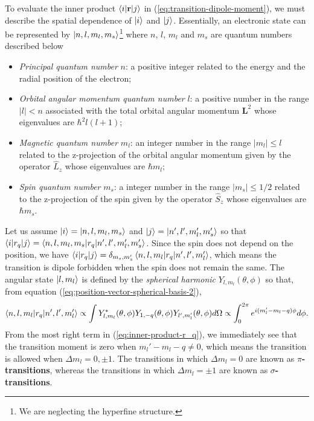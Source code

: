 To evaluate the inner product $ \braket{i|\mathbf{r}|j} $ in (\ref{eq:transition-dipole-moment}), we must describe the spatial dependence of $ \ket{i} $ and $ \ket{j} $. Essentially, an electronic state can be represented by $ \ket{n, l, m_l, m_s} $\footnote{We are neglecting the hyperfine structure.} where $n$, $l$, $m_l$ and $ m_s $ are quantum numbers described below
\begin{itemize}
	\item \textit{Principal quantum number} $ n $: a positive integer related to the energy and the radial position of the electron;

	\item \textit{Orbital angular momentum quantum number} $ l $: a positive number in the range $ |l| < n  $ associated with the total orbital angular momentum $ \mathbf{L}^2 $ whose eigenvalues are $ \hbar^2 l(l + 1) $;

	\item \textit{Magnetic quantum number} $ m_l $: an integer number in the range $ |m_l| \leq l $ related to the z-projection of the orbital angular momentum given by the operator $ \hat{L}_z $ whose eigenvalues are $ \hbar m_l $;

	\item \textit{Spin quantum number} $ m_s $: a integer number in the range $ |m_s| \leq 1/2 $ related to the z-projection of the spin given by the operator $ \hat{S}_z $ whose eigenvalues are $ \hbar m_s $.
\end{itemize}

Let us assume $ \ket{i} = \ket{n,l,m_l,m_s} $ and $ \ket{j} = \ket{n',l',m_l',m_s'} $ so that $ \braket{i|r_q|j} = \braket{n,l,m_l,m_s|r_q|n',l',m_l',m_s'} $. Since the spin does not depend on the position, we have $ \braket{i|r_q|j} = \delta_{m_s,m_s'}\braket{n,l,m_l|r_q|n',l',m_l'} $, which means the transition is dipole forbidden when the spin does not remain the same. The angular state $ \ket{l, m_l} $ is defined by the \textit{spherical harmonic} $ Y_{l,m_l}(\theta, \phi) $ so that, from equation (\ref{eq:position-vector-spherical-basis-2}),
\begin{equation}
	\braket{n,l,m_l|r_q|n',l',m_l'} \propto \int Y_{l,m_l}^*(\theta, \phi) Y_{1, -q}(\theta, \phi) Y_{l', m_l'}(\theta, \phi)d\Omega \propto \int_{0}^{2\pi} e^{i(m_l' - m_l - q)\phi} d\phi.
	\label{eq:inner-product-r_q}
\end{equation}
From the most right term in (\ref{eq:inner-product-r_q}), we immediately see that the transition moment is zero when $ m_l' - m_l - q \neq 0 $, which means the transition is allowed when $ \Delta m_l = 0, \pm 1 $. The transitions in which $ \Delta m_l = 0 $ are known as \textbf{$\pi$-transitions}, whereas the transitions in which $ \Delta m_l = \pm 1$ are known as \textbf{$\sigma$-transitions}.

